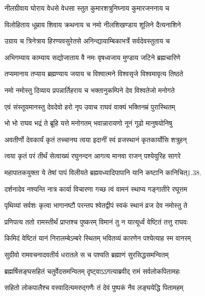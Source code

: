 \twolineshloka
{नीलग्रीवाय घोराय वेधसे वेधसा स्तुत}
{कुमारशत्रुनिघ्नाय कुमारजननाय च}%

\twolineshloka
{विलोहिताय धूम्राय शिवाय क्रथनाय च}
{नमो नीलशिखण्डाय शूलिने दैत्यनाशिने}%

\twolineshloka
{उग्राय च त्रिनेत्राय हिरण्यवसुरेतसे}
{अनिन्द्यायाम्बिकाभर्त्रे सर्वदेवस्तुताय च}%

\twolineshloka
{अभिगम्याय काम्याय सद्योजाताय वै नमः}
{वृषध्वजाय मुण्डाय जटिने ब्रह्मचारिणे}%

\twolineshloka
{तप्यमानाय तप्याय ब्रह्मण्याय जयाय च}
{विश्वात्मने विश्वसृजे विश्वमावृत्य तिष्ठते}%

\twolineshloka
{नमो नमोस्तु दिव्याय प्रपन्नार्तिहराय च}
{भक्तानुकम्पिने देव विश्वतेजो मनोगते}%


\twolineshloka
{एवं संस्तूयमानस्तु देवदेवो हरो नृप}
{उवाच राघवं वाक्यं भक्तिनम्रं पुरास्थितम्}%


\twolineshloka
{भो भो राघव भद्रं ते ब्रूहि यत्ते मनोगतम्}
{भवान्नारायणो नूनं गूढो मानुषयोनिषु}%

\twolineshloka
{अवतीर्णो देवकार्यं कृतं तच्चानघ त्वया}
{इदानीं स्वं व्रजस्थानं कृतकार्योसि शत्रुहन्}%

\twolineshloka
{त्वया कृतं परं तीर्थं सेत्वाख्यं रघुनन्दन}
{आगत्य मानवा राजन् पश्येयुरिह सागरे}%

\twolineshloka
{महापातकयुक्ता ये तेषां पापं विलीयते}
{ब्रह्मवध्यादिपापानि यानि कष्टानि कानिचित्1.38.}%

\twolineshloka
{दर्शनादेव नश्यन्ति नात्र कार्या विचारणा}
{गच्छ त्वं वामनं स्थाप्य गङ्गातीरे रघूत्तम}%

\twolineshloka
{पृथिव्यां सर्वशः कृत्वा भागानष्टौ परन्तप}
{श्वेतद्वीपं स्वकं स्थानं व्रज देव नमोस्तु ते}%

\twolineshloka
{प्रणिपत्य ततो रामस्तीर्थं प्राप्तश्च पुष्करम्}
{विमानं तु न यात्यूर्ध्वं वेष्टितं तत्तु राघवः}%

\twolineshloka
{किमिदं वेष्टितं यानं निरालम्बेऽम्बरे स्थितम्}
{भवितव्यं कारणेन पश्येत्याह स्म वानरम्}%

\twolineshloka
{सुग्रीवो रामवचनादवतीर्य धरातले}
{स च पश्यति ब्रह्माणं सुरसिद्धसमन्वितम्}%

\twolineshloka
{ब्रह्मर्षिसङ्घसहितं चतुर्वेदसमन्वितम्}
{दृष्ट्वाऽऽगत्याब्रवीद् रामं सर्वलोकपितामहः}%

\twolineshloka
{सहितो लोकपालैश्च वस्वादित्यमरुद्गणैः}
{तं देवं पुष्पकं नैव लङ्घयेद्धि पितामहम्}%

